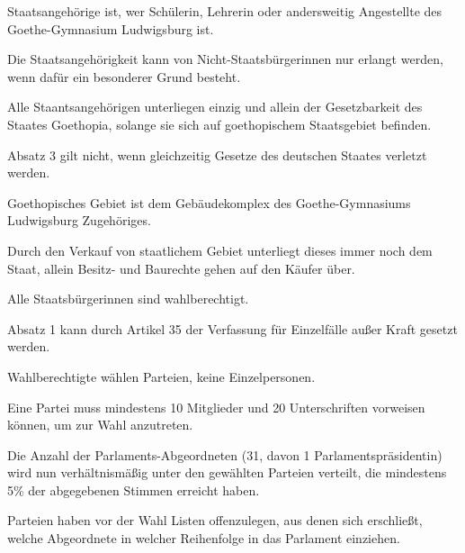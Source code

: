 \documentclass{sasbase}
\begin{document}
\begin{article}[Staatsangehörigkeit]
	\item Staatsangehörige ist, wer Schülerin, Lehrerin oder andersweitig Angestellte des Goethe-Gymnasium Ludwigsburg ist.
	\item Die Staatsangehörigkeit kann von Nicht-Staatsbürgerinnen nur erlangt werden, wenn dafür ein besonderer Grund besteht.
	\item Alle Staantsangehörigen unterliegen einzig und allein der Gesetzbarkeit des Staates Goethopia, solange sie sich auf goethopischem Staatsgebiet befinden.
	\item Absatz 3 gilt nicht, wenn gleichzeitig Gesetze des deutschen Staates verletzt werden.
\end{article}

\begin{article}[Staatsgebiet]
	\item Goethopisches Gebiet ist dem Gebäudekomplex des Goethe-Gymnasiums Ludwigsburg Zugehöriges.
	\item Durch den Verkauf von staatlichem Gebiet unterliegt dieses immer noch dem Staat, allein Besitz- und Baurechte gehen auf den Käufer über.  
\end{article}

\begin{article}[Wahlrecht]
	\item Alle Staatsbürgerinnen sind wahlberechtigt.
	\item Absatz 1 kann durch Artikel 35 der Verfassung für Einzelfälle außer Kraft gesetzt werden.
	\item Wahlberechtigte wählen Parteien, keine Einzelpersonen.
	\item Eine Partei muss mindestens 10 Mitglieder und 20 Unterschriften vorweisen können, um zur Wahl anzutreten.
	\item Die Anzahl der Parlaments-Abgeordneten (31, davon 1 Parlamentspräsidentin) wird nun verhältnismäßig unter den gewählten Parteien verteilt, die mindestens 5\% der abgegebenen Stimmen erreicht haben.
	\item Parteien haben vor der Wahl Listen offenzulegen, aus denen sich erschließt, welche Abgeordnete in welcher Reihenfolge in das Parlament einziehen.
\end{article}
\end{document}
